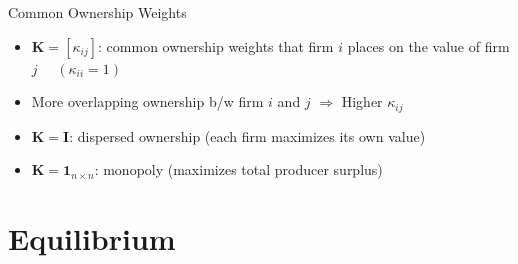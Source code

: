 \documentclass[
  10pt,               %
  aspectratio=169,    %
  handout             %
]{beamer}
\theoremstyle{plain}
\begin{document}
%
\begin{frame}{Common Ownership Weights}
  \label{ownership_weight}
  \begin{itemize}
    \item $\bm{K}=\left[\kappa_{ij}\right]$: common ownership weights that firm $i$ places on the value of firm $j$ $\quad (\kappa_{ii} = 1)$
    \medskip{}
    \item More overlapping ownership b/w firm $i$ and $j$ $\Longrightarrow$ Higher $\kappa_{ij}$ \hfill\hyperlink{rotemberg}{}
    \medskip{}
    \item $\bm{K}=\bm{I}$: dispersed ownership (each firm maximizes its own value)
    \medskip{}
    \item  $\bm{K}=\bm{1}_{n \times n}$: monopoly (maximizes total producer surplus)
  \end{itemize}
\end{frame}

\section{Equilibrium}
\end{document}
